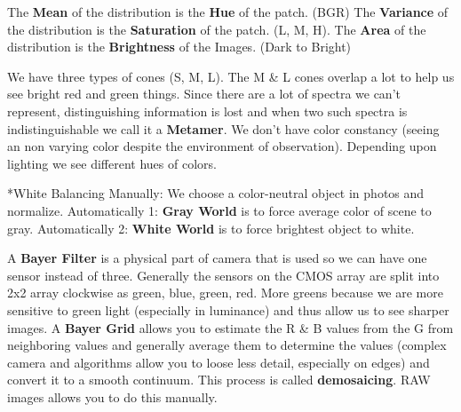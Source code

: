 \documentclass[3pt,landscape]{article}
\makeatletter
\renewcommand{\subsection}{\@startsection{subsection}{2}{0mm}{-1explus -.5ex minus -.2ex}{0.5ex plus .2ex}{\normalfont\normalsize\bfseries}}
\makeatother
\begin{document}
\begin{multicols}{3}

The \textbf{Mean} of the distribution is the \textbf{Hue} of the patch. (BGR) The \textbf{Variance} of the distribution is the \textbf{Saturation} of the patch. (L, M, H). The \textbf{Area} of the distribution is the \textbf{Brightness} of the Images. (Dark to Bright)

We have three types of cones (S, M, L). The M \& L cones overlap a lot to help us see bright red and green things. Since there are a lot of spectra we can't represent, distinguishing information is lost and when two such spectra is indistinguishable we call it a \textbf{Metamer}. We don't have color constancy (seeing an non varying color despite the environment of observation). Depending upon lighting we see different hues of colors. 


\subsection*{White Balancing}
Manually: We choose a color-neutral object in photos and normalize. Automatically 1: \textbf{Gray World} is to force average color of scene to gray. Automatically 2: \textbf{White World} is to force brightest object to white. 

A \textbf{Bayer Filter} is a physical part of camera that is used so we can have one sensor instead of three. Generally the sensors on the CMOS array are split into 2x2 array clockwise as green, blue, green, red. More greens because we are more sensitive to green light (especially in luminance) and thus allow us to see sharper images. A \textbf{Bayer Grid} allows you to estimate the R \& B values from the G from neighboring values and generally average them to determine the values (complex camera and algorithms allow you to loose less detail, especially on edges) and convert it to a smooth continuum. This process is called \textbf{demosaicing}. RAW images allows you to do this manually. 


\end{multicols}
\end{document}
